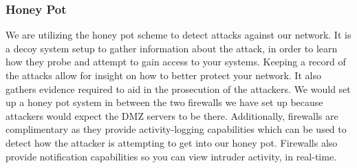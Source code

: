 \begin{center}
\vspace{2.5em}



\end{center}

\subsubsection{Honey Pot}
We are utilizing the honey pot scheme to detect attacks against our network. It
is a decoy system setup to gather information about the attack, in order to
learn how they probe and attempt to gain access to your systems. Keeping a
record of the attacks allow for insight on how to better protect your network.
It also gathers evidence required to aid in the prosecution of the
attackers. We would set up a honey pot system in between the two firewalls we
have set up because attackers would expect the DMZ servers to be there.
Additionally, firewalls are complimentary as they provide activity-logging
capabilities which can be used to detect how the attacker is attempting to get
into our honey pot. Firewalls also provide notification capabilities so you can
view intruder activity, in real-time.

